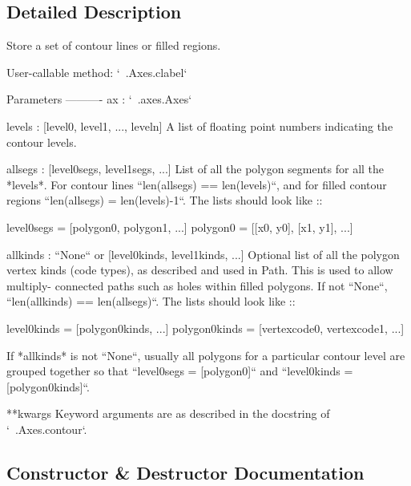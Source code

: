 \subsection{Detailed Description}
\begin{DoxyVerb}Store a set of contour lines or filled regions.

User-callable method: `~.Axes.clabel`

Parameters
----------
ax : `~.axes.Axes`

levels : [level0, level1, ..., leveln]
    A list of floating point numbers indicating the contour levels.

allsegs : [level0segs, level1segs, ...]
    List of all the polygon segments for all the *levels*.
    For contour lines ``len(allsegs) == len(levels)``, and for
    filled contour regions ``len(allsegs) = len(levels)-1``. The lists
    should look like ::

        level0segs = [polygon0, polygon1, ...]
        polygon0 = [[x0, y0], [x1, y1], ...]

allkinds : ``None`` or [level0kinds, level1kinds, ...]
    Optional list of all the polygon vertex kinds (code types), as
    described and used in Path. This is used to allow multiply-
    connected paths such as holes within filled polygons.
    If not ``None``, ``len(allkinds) == len(allsegs)``. The lists
    should look like ::

        level0kinds = [polygon0kinds, ...]
        polygon0kinds = [vertexcode0, vertexcode1, ...]

    If *allkinds* is not ``None``, usually all polygons for a
    particular contour level are grouped together so that
    ``level0segs = [polygon0]`` and ``level0kinds = [polygon0kinds]``.

**kwargs
    Keyword arguments are as described in the docstring of
    `~.Axes.contour`.

\end{DoxyVerb}
 

\subsection{Constructor \& Destructor Documentation}
\mbox{\label{classmatplotlib_1_1contour_1_1ContourSet_a7388e3a3a4d5f6d25e9d2d901b255222}} 
